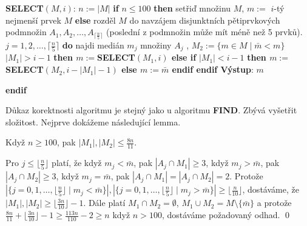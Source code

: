 \documentclass[a4paper,12pt]{article}
\begin{document}
{\bf SELECT$(M,i)$}:\newline 
$n:=|M|$\newline 
{\bf if} $n\le 100$ {\bf then\newline 
\phantom{{\rm---}}}setři\v d množinu $M$, $m:=$ $i$-tý nejmenší 
prvek $M$\newline 
{\bf else\newline 
\phantom{{\rm---}}}rozděl $M$ do navzájem disjunktních 
pětiprvkových podmnožin $A_1,A_2,\dots,A_{\lceil\frac n5\rceil}$\newline 
\phantom{---}(poslední z podmnožin může mít méně než 5 prvků).\newline 
\phantom{---}{\bf for every} $j=1,2,\dots,\lceil\frac n5\rceil$ {\bf do\newline 
\phantom{{\rm------}}}najdi medián $m_j$ množiny $A_j$\newline 
{}, $M_2:=\{m\in 
M\mid\bar {m}<m\}$\newline 
\phantom{---}{\bf if} $|M_1|>i-1$ {\bf then\newline 
\phantom{{\rm ------}}$m:=$SELECT$(M_1,i)$\newline 
\phantom{{\rm ---}}else\newline 
\phantom{{\rm------}}if} $|M_1|<i-1$ {\bf then\newline 
\phantom{{\rm ---------}}$m:=$SELECT$(M_2,i-|M_1|-1)$\newline 
\phantom{{\rm ------}}else\newline 
\phantom{{\rm ---------}}$m:=\bar {m}$\newline 
\phantom{{\rm ------}}endif\newline 
\phantom{{\rm ---}}endif\newline 
\phantom{{\rm ---}}Výstup}: $m$\newline 
{\bf endif

}
Důkaz korektnosti algoritmu je stejný 
jako u algoritmu {\bf FIND}. 
Zbývá vyšetřit složitost. Nej\-prve dokážeme následující 
lemma.

\begin{lemma}Když $n\ge 100$, pak $|M_1|,|M_2|\le\frac {8n}{
11}$.
\end{lemma}

 Pro $j\le\lfloor\frac n5\rfloor$ platí, že když $
m_j<\bar {m}$, pak 
$|A_j\cap M_1|\ge 3$, když $m_j>\bar {m}$, pak $|A_j\cap M_2|\ge 
3$, když $m_j=\bar {m}$, 
pak $|A_j\cap M_1|=|A_j\cap M_2|=2$.  Protože 
$|\{j=0,1,\dots,\lfloor\frac n5\rfloor\mid m_j<\bar {m}\}|,|\{j=0
,1,\dots,\lfloor\frac n5\rfloor\mid m_j>\bar {m}\}|\ge\lfloor\frac 
n{10}\rfloor$, 
dostáváme, že $|M_1|,|M_2|\ge\lfloor\frac {3n}{10}\rfloor 
-1$.  Dále platí $M_1\cap M_2=\emptyset$, 
$M_1\cup M_2=M\setminus \{\bar {m}\}$ a protože $\frac {8n}{11}
+\lfloor\frac {3n}{10}\rfloor -1\ge\frac {113n}{110}-2\ge n$ 
když $n>100$, dostáváme požadovaný odhad. \qed
\enddemo
\end{document}
